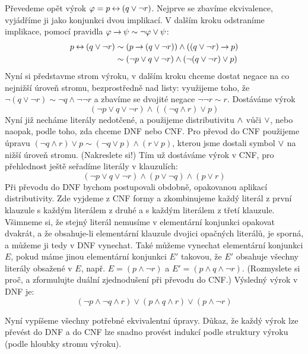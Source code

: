 \begin{example}
    Převedeme opět výrok $\varphi=p\mathbin{\leftrightarrow} (q\lor \neg r)$. Nejprve se zbavíme ekvivalence, vyjádříme ji jako konjunkci dvou implikací. V dalším kroku odstraníme implikace, pomocí pravidla $\varphi\mathbin{\rightarrow}\psi\sim\neg\varphi\lor\psi$:
    \begin{align*}
        p\mathbin{\leftrightarrow} (q\lor \neg r) &\sim (p\mathbin{\rightarrow} (q\lor \neg r)) \land ((q\lor \neg r) \mathbin{\rightarrow} p)\\
        &\sim (\neg p\lor q\lor \neg r) \land (\neg (q\lor \neg r) \lor p)
    \end{align*}
    Nyní si představme strom výroku, v dalším kroku chceme dostat negace na co nejnižší úroveň stromu, bezprostředně nad listy: využijeme toho, že $\neg (q\lor \neg r)\sim \neg q\land \neg\neg r$ a zbavíme se dvojité negace $\neg\neg r\sim r$. Dostáváme výrok 
    $$
    (\neg p\lor q\lor \neg r) \land ( (\neg q\land r) \lor p)
    $$
    Nyní již necháme literály nedotčené, a použijeme distributivitu ${\land}$ vůči ${\lor}$, nebo naopak, podle toho, zda chceme DNF nebo CNF. Pro převod do CNF použijeme úpravu $(\neg q\land r) \lor p\sim (\neg q\lor p)\land (r \lor p) $, kterou jsme dostali symbol ${\lor}$ na nižší úroveň stromu. (Nakreslete si!) Tím už dostáváme výrok v CNF, pro přehlednost ještě seřadíme literály v klauzulích:
    $$
    (\neg p\lor q\lor \neg r) \land (p\lor \neg q) \land (p \lor r) 
    $$
    Při převodu do DNF bychom postupovali obdobně, opakovanou aplikací distributivity. Zde vyjdeme z CNF formy a zkombinujeme každý literál z první klauzule s každým literálem z druhé a s každým literálem z třetí klauzule. Všimneme si, že stejný literál nemusíme v elementární konjunkci opakovat dvakrát, a že obsahuje-li elementární klauzule dvojici opačných literálů, je sporná, a můžeme ji tedy v DNF vynechat. Také můžeme vynechat elementární konjunkci $E$, pokud máme jinou elementární konjunkci $E'$ takovou, že $E'$ obsahuje všechny literály obsažené v $E$, např. $E=(p\land \neg r)$ a $E'=(p\land q \land \neg r)$. (Rozmyslete si proč, a zformulujte duální zjednodušení při převodu do CNF.) Výsledný výrok v DNF je:
    $$
    (\neg p \land \neg q\land r) \lor (p\land q \land r) \lor (p\land \neg r)
    $$
\end{example}

Nyní vypíšeme všechny potřebné ekvivalentní úpravy. Důkaz, že každý výrok lze převést do DNF a do CNF lze snadno provést indukcí podle struktury výroku (podle hloubky stromu výroku).

